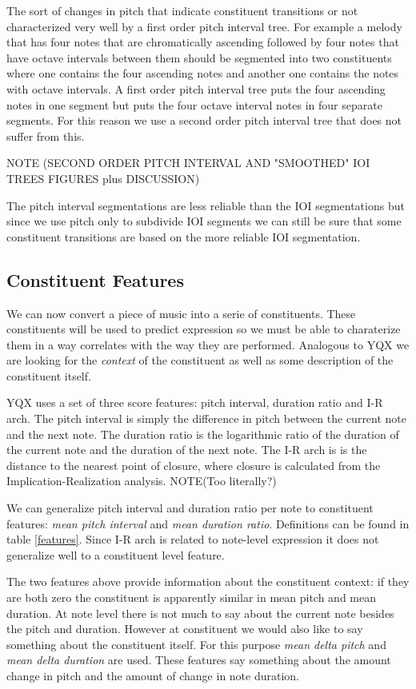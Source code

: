 \documentclass[a4paper,10pt]{article}
\begin{document}
The sort of changes in pitch that indicate constituent transitions or not characterized very well by a first order pitch interval tree. For example a melody that has four notes that are chromatically ascending followed by four notes that have octave intervals between them should be segmented into two constituents where one contains the four ascending notes and another one contains the notes with octave intervals. A first order pitch interval tree puts the four ascending notes in one segment but puts the four octave interval notes in four separate segments. For this reason we use a second order pitch interval tree that does not suffer from this. 

NOTE (SECOND ORDER PITCH INTERVAL AND "SMOOTHED" IOI TREES FIGURES plus DISCUSSION)

The pitch interval segmentations are less reliable than the IOI segmentations but since we use pitch only to subdivide IOI segments we can still be sure that some constituent transitions are based on the more reliable IOI segmentation.

\subsection{Constituent Features}
\label{scorefeatures}

We can now convert a piece of music into a serie of constituents. These constituents will be used to predict expression so we must be able to charaterize them in a way correlates with the way they are performed. Analogous to YQX we are looking for the \textit{context} of the constituent as well as some description of the constituent itself.

YQX uses a set of three score features: pitch interval, duration ratio and I-R arch. The pitch interval is simply the difference in pitch between the current note and the next note. The duration ratio is the logarithmic ratio of the duration of the current note and the duration of the next note.  The I-R arch is is the distance to the nearest point of closure, where closure is calculated from the Implication-Realization analysis. NOTE(Too literally?)

We can generalize pitch interval and duration ratio per note to constituent features: \textit{mean pitch interval} and \textit{mean duration ratio}. Definitions can be found in table \ref{features}. Since I-R arch is related to note-level expression it does not generalize well to a constituent level feature. 

The two features above provide information about the constituent context: if they are both zero the constituent is apparently similar in mean pitch and mean duration. At note level there is not much to say about the current note besides the pitch and duration. However at constituent we would also like to say something about the constituent itself. For this purpose \textit{mean delta pitch} and \textit{mean delta duration} are used. These features say something about the amount change in pitch and the amount of change in note duration.
\end{document}
